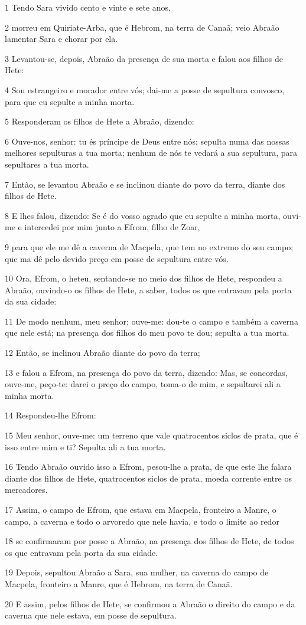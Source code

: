 \par 1 Tendo Sara vivido cento e vinte e sete anos,
\par 2 morreu em Quiriate-Arba, que é Hebrom, na terra de Canaã; veio Abraão lamentar Sara e chorar por ela.
\par 3 Levantou-se, depois, Abraão da presença de sua morta e falou aos filhos de Hete:
\par 4 Sou estrangeiro e morador entre vós; dai-me a posse de sepultura convosco, para que eu sepulte a minha morta.
\par 5 Responderam os filhos de Hete a Abraão, dizendo:
\par 6 Ouve-nos, senhor: tu és príncipe de Deus entre nós; sepulta numa das nossas melhores sepulturas a tua morta; nenhum de nós te vedará a sua sepultura, para sepultares a tua morta.
\par 7 Então, se levantou Abraão e se inclinou diante do povo da terra, diante dos filhos de Hete.
\par 8 E lhes falou, dizendo: Se é do vosso agrado que eu sepulte a minha morta, ouvi-me e intercedei por mim junto a Efrom, filho de Zoar,
\par 9 para que ele me dê a caverna de Macpela, que tem no extremo do seu campo; que ma dê pelo devido preço em posse de sepultura entre vós.
\par 10 Ora, Efrom, o heteu, sentando-se no meio dos filhos de Hete, respondeu a Abraão, ouvindo-o os filhos de Hete, a saber, todos os que entravam pela porta da sua cidade:
\par 11 De modo nenhum, meu senhor; ouve-me: dou-te o campo e também a caverna que nele está; na presença dos filhos do meu povo te dou; sepulta a tua morta.
\par 12 Então, se inclinou Abraão diante do povo da terra;
\par 13 e falou a Efrom, na presença do povo da terra, dizendo: Mas, se concordas, ouve-me, peço-te: darei o preço do campo, toma-o de mim, e sepultarei ali a minha morta.
\par 14 Respondeu-lhe Efrom:
\par 15 Meu senhor, ouve-me: um terreno que vale quatrocentos siclos de prata, que é isso entre mim e ti? Sepulta ali a tua morta.
\par 16 Tendo Abraão ouvido isso a Efrom, pesou-lhe a prata, de que este lhe falara diante dos filhos de Hete, quatrocentos siclos de prata, moeda corrente entre os mercadores.
\par 17 Assim, o campo de Efrom, que estava em Macpela, fronteiro a Manre, o campo, a caverna e todo o arvoredo que nele havia, e todo o limite ao redor
\par 18 se confirmaram por posse a Abraão, na presença dos filhos de Hete, de todos os que entravam pela porta da sua cidade.
\par 19 Depois, sepultou Abraão a Sara, sua mulher, na caverna do campo de Macpela, fronteiro a Manre, que é Hebrom, na terra de Canaã.
\par 20 E assim, pelos filhos de Hete, se confirmou a Abraão o direito do campo e da caverna que nele estava, em posse de sepultura.

